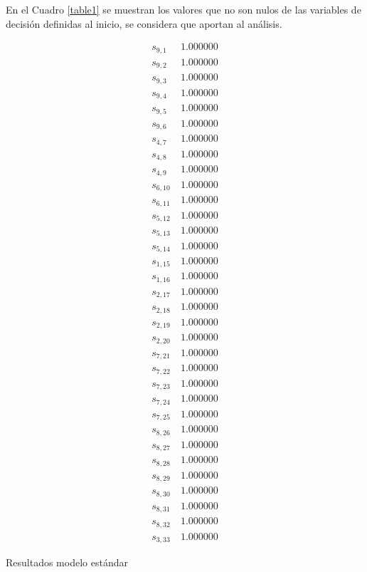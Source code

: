 \documentclass[journal, 10pt]{IEEEtran}
\begin{document}
En el Cuadro \ref{table1} se muestran los valores que no son nulos de las variables de decisión definidas al inicio, se considera que aportan al análisis.
\begin{table}
	\begin{align*}
		s_{9,1}&   \     1.000000\\        
		s_{9,2}&   \     1.000000\\          
		s_{9,3}&   \     1.000000\\            
		s_{9,4}&   \     1.000000\\           
		s_{9,5}&   \     1.000000\\           
		s_{9,6}&   \     1.000000\\          
		s_{4,7}&   \     1.000000\\        
		s_{4,8}&   \     1.000000\\         
		s_{4,9}&   \     1.000000\\            
	 s_{6,10}&     \   1.000000\\           
	 s_{6,11}&     \   1.000000\\            
	 s_{5,12}&     \   1.000000\\            
	 s_{5,13}&     \   1.000000\\         
	 s_{5,14}&     \   1.000000\\            
	 s_{1,15}&     \   1.000000\\           
	 s_{1,16}&     \   1.000000\\            
	 s_{2,17}&     \   1.000000\\         
	 s_{2,18}&     \   1.000000\\          
	 s_{2,19}&     \   1.000000\\            
	 s_{2,20}&     \   1.000000\\            
	 s_{7,21}&     \   1.000000\\           
	 s_{7,22}&     \   1.000000\\            
	 s_{7,23}&     \   1.000000\\            
	 s_{7,24}&     \   1.000000\\           
	 s_{7,25}&     \   1.000000\\            
	 s_{8,26}&     \   1.000000\\           
	 s_{8,27}&     \   1.000000\\            
	 s_{8,28}&     \   1.000000\\         
	 s_{8,29}&     \   1.000000\\         
	 s_{8,30}&     \   1.000000\\          
	 s_{8,31}&     \   1.000000\\        
	 s_{8,32}&     \   1.000000\\       
	 s_{3,33}&     \   1.000000 
	\end{align*}
\caption{Resultados modelo estándar}
\label{table1}
\end{table}
\end{document}
